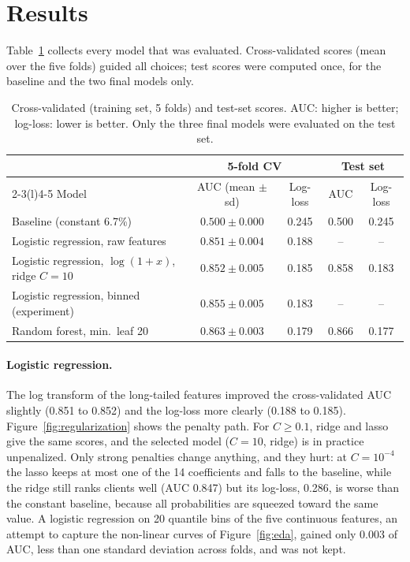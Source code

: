\section{Results}
\label{sec:results}
Table~\ref{tab:results} collects every model that was evaluated. Cross-validated
scores (mean over the five folds) guided all choices; test scores were computed
once, for the baseline and the two final models only.

\begin{table}[ht]
  \centering
  \small
  \caption{Cross-validated (training set, 5 folds) and test-set scores. AUC:
  higher is better; log-loss: lower is better. Only the three final models were
  evaluated on the test set.}
  \label{tab:results}
  \begin{tabular}{@{}lcccc@{}}
    \toprule
    & \multicolumn{2}{c}{5-fold CV} & \multicolumn{2}{c}{Test set} \\
    \cmidrule(lr){2-3}\cmidrule(l){4-5}
    Model & AUC (mean $\pm$ sd) & Log-loss & AUC & Log-loss \\
    \midrule
    Baseline (constant 6.7\%)                & $0.500 \pm 0.000$ & 0.245 & 0.500 & 0.245 \\
    Logistic regression, raw features        & $0.851 \pm 0.004$ & 0.188 & --    & --    \\
    Logistic regression, $\log(1+x)$, ridge $C{=}10$ & $0.852 \pm 0.005$ & 0.185 & 0.858 & 0.183 \\
    Logistic regression, binned (experiment) & $0.855 \pm 0.005$ & 0.183 & --    & --    \\
    Random forest, min.\ leaf 20             & $0.863 \pm 0.003$ & 0.179 & 0.866 & 0.177 \\
    \bottomrule
  \end{tabular}
\end{table}

\paragraph{Logistic regression.} The log transform of the long-tailed features
improved the cross-validated AUC slightly (0.851 to 0.852) and the log-loss
more clearly (0.188 to 0.185). Figure~\ref{fig:regularization} shows the
penalty path. For $C \geq 0.1$, ridge and lasso give the same scores, and the
selected model ($C = 10$, ridge) is in practice unpenalized. Only strong
penalties change anything, and they hurt: at $C = 10^{-4}$ the lasso keeps at
most one of the 14 coefficients and falls to the baseline, while the ridge
still ranks clients well (AUC 0.847) but its log-loss, 0.286, is worse than
the constant baseline, because all probabilities are squeezed toward the same
value. A logistic regression on 20 quantile bins of the five continuous
features, an attempt to capture the non-linear curves of
Figure~\ref{fig:eda}, gained only 0.003 of AUC, less than one standard
deviation across folds, and was not kept.

